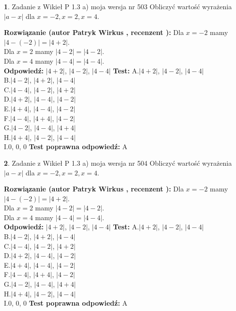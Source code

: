 \documentclass[12pt, a4paper]{article}
\theoremstyle{definition} %
\newtheorem{zad}{}
\newcommand{\zadStart}[1]{\begin{zad}#1\newline}
\newcommand{\zadStop}{\end{zad}}
\newcommand{\rozwStart}[2]{\noindent \textbf{Rozwiązanie (autor #1 , recenzent #2): }\newline}
\newcommand{\rozwStop}{\newline}
\newcommand{\odpStart}{\noindent \textbf{Odpowiedź:}\newline}
\newcommand{\odpStop}{\newline}
\newcommand{\testStart}{\noindent \textbf{Test:}\newline}
\newcommand{\testStop}{\newline}
\newcommand{\kluczStart}{\noindent \textbf{Test poprawna odpowiedź:}\newline}
\newcommand{\kluczStop}{\newline}
\begin{document}
\zadStart{Zadanie z Wikieł P 1.3 a) moja wersja nr 503}
Obliczyć wartość wyrażenia $|a - x|$ dla $x=-2,x=2,x=4$.
\zadStop
\rozwStart{Patryk Wirkus}{}
Dla $x = -2$ mamy $|4 - (-2)| = |4 + 2|$.\\
Dla $x = 2$ mamy $|4 - 2| = |4 - 2|$.\\
Dla $x = 4$ mamy $|4 - 4| = |4 - 4|$.\\
\rozwStop
\odpStart
$|4 + 2|$, $|4 - 2|$, $|4 - 4|$
\odpStop
\testStart
A.$|4 + 2|$, $|4 - 2|$, $|4 - 4|$\\
B.$|4 - 2|$, $|4 + 2|$, $|4 - 4|$\\
C.$|4 - 4|$, $|4 - 2|$, $|4 + 2|$\\
D.$|4 + 2|$, $|4 - 4|$, $|4 - 2|$\\
E.$|4 + 4|$, $|4 - 4|$, $|4 - 2|$\\
F.$|4 - 4|$, $|4 + 4|$, $|4 - 2|$\\
G.$|4 - 2|$, $|4 - 4|$, $|4 + 4|$\\
H.$|4 + 4|$, $|4 - 2|$, $|4 - 4|$\\
I.$0$, $0$, $0$
\testStop
\kluczStart
A
\kluczStop



\zadStart{Zadanie z Wikieł P 1.3 a) moja wersja nr 504}
Obliczyć wartość wyrażenia $|a - x|$ dla $x=-2,x=2,x=4$.
\zadStop
\rozwStart{Patryk Wirkus}{}
Dla $x = -2$ mamy $|4 - (-2)| = |4 + 2|$.\\
Dla $x = 2$ mamy $|4 - 2| = |4 - 2|$.\\
Dla $x = 4$ mamy $|4 - 4| = |4 - 4|$.\\
\rozwStop
\odpStart
$|4 + 2|$, $|4 - 2|$, $|4 - 4|$
\odpStop
\testStart
A.$|4 + 2|$, $|4 - 2|$, $|4 - 4|$\\
B.$|4 - 2|$, $|4 + 2|$, $|4 - 4|$\\
C.$|4 - 4|$, $|4 - 2|$, $|4 + 2|$\\
D.$|4 + 2|$, $|4 - 4|$, $|4 - 2|$\\
E.$|4 + 4|$, $|4 - 4|$, $|4 - 2|$\\
F.$|4 - 4|$, $|4 + 4|$, $|4 - 2|$\\
G.$|4 - 2|$, $|4 - 4|$, $|4 + 4|$\\
H.$|4 + 4|$, $|4 - 2|$, $|4 - 4|$\\
I.$0$, $0$, $0$
\testStop
\kluczStart
A
\kluczStop
\end{document}
